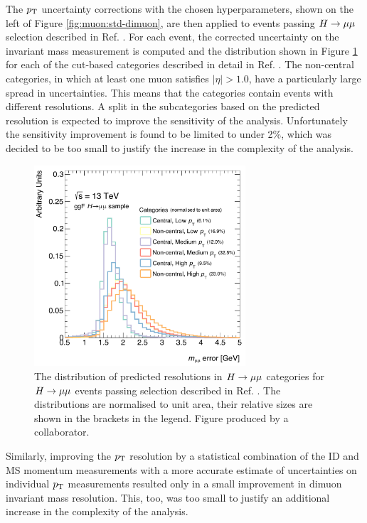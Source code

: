 The $p_{\text{T}}$ uncertainty corrections with the chosen hyperparameters,
shown on the left of Figure \ref{fig:muon:std-dimuon}, are then applied
to events passing $\hmumu$ selection described in Ref.
\cite{ATLAS-CONF-2018-026}. For each event, the corrected uncertainty
on the invariant mass measurement is computed and the distribution
shown in Figure \ref{fig:muon:hmumu} for each of the cut-based categories
described in detail in Ref. \cite{ATLAS-CONF-2018-026}. The non-central
categories, in which at least one muon satisfies
$|\eta| > 1.0$, have a particularly large spread in uncertainties. This means
that the categories contain events with different resolutions. A split in
the subcategories based on the predicted resolution is expected to
improve the sensitivity of the analysis. Unfortunately the sensitivity
improvement is found to be limited to under 2\%, which was decided
to be too small to justify the increase in the complexity of the analysis.
\begin{figure}[h!]
  \centering
  \includegraphics[width=0.7\textwidth]{figures/muons/vader-hmumu}
  \caption[Distribution of predicted resolutions in $\hmumu$ categories]
  {The distribution of predicted resolutions in $\hmumu$ categories for
  \ggf~$\hmumu$ events passing selection described in Ref.
  \cite{ATLAS-CONF-2018-026}. The distributions are normalised
  to unit area, their relative sizes are shown in the brackets in
  the legend. Figure produced by a collaborator.
  }
  \label{fig:muon:hmumu}
\end{figure}

Similarly, improving the $p_{\text{T}}$ resolution by a statistical combination
of the ID and MS momentum measurements with a more accurate estimate
of uncertainties on individual $p_{\text{T}}$ measurements resulted only in a small
improvement in dimuon invariant mass resolution. This, too, was too small
to justify an additional increase in the complexity of the analysis.





